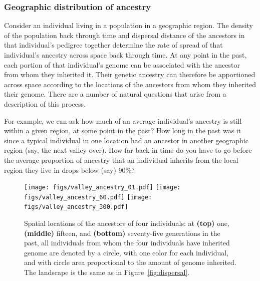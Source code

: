 \documentclass{ar-1col}
\newcommand{\g}[1]{{\color{blue}{#1}}}
\newcommand{\plr}[1]{{\color{green}{#1}}}
\newcommand{\todo}[1]{{\textbf{\color{red}{#1}}}}
\begin{document}
\subsubsection{Geographic distribution of ancestry}

Consider an individual living in a population in a geographic region.
The density of the population back through time and 
dispersal distance of the ancestors in that individual's pedigree 
together determine the rate of spread of that individual's ancestry 
across space back through time.
At any point in the past,
each portion of that individual's genome can be associated 
with the ancestor from whom they inherited it.
Their genetic ancestry can therefore be apportioned across space according
to the locations of the ancestors from whom they inherited their genome.
There are a number of natural questions that arise from a description of this process.

For example, we can ask how much of an average individual's ancestry is still within a given region, at some point in the past?
How long in the past was it since a typical individual in one location had an ancestor
in another geographic region (say, the next valley over).
How far back in time do you have to go before the average proportion of ancestry that an individual inherits
from the local region they live in drops below (say) 90\%?

\todo{tidy and conclude}

\begin{figure}[ht]
    \centering
        \texttt{[image: figs/valley\_ancestry\_01.pdf]}
        \texttt{[image: figs/valley\_ancestry\_60.pdf]}
        \texttt{[image: figs/valley\_ancestry\_300.pdf]}
        \caption{
            Spatial locations of the ancestors of four individuals:
            at 
            \textbf{(top)} one, 
            \textbf{(middle)} fifteen, and
            \textbf{(bottom)} seventy-five generations in the past,
            all individuals from whom the four individuals have inherited genome are denoted by a circle,
            with one color for each individual,
            and with circle area proportional to the amount of genome inherited.
            The landscape is the same as in Figure~\ref{fig:dispersal}.
            \g{I say keep 1, 20, and 75.  If you go back farther, 
            	does it get even clearer that the pedigrees have ``forgotten" which side of the ridge the modern inds are on? 
                If so, that might make the point more clearly.}
            \plr{it does; I haven't run the simulation that long, though.}
        }
        \label{ancestry_spread}
\end{figure}
\end{document}
